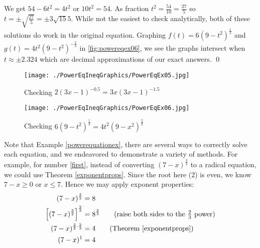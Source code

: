 \begin{ex}
\begin{enumerate}
We get $54 - 6t^2 = 4t^2$ or $10t^2 = 54$.  As fraction $t^2 = \frac{54}{10} = \frac{27}{5}$ so $t = \pm \sqrt{\frac{27}{5}} = \pm 3 \sqrt{15}{5}$.  While not the easiest to check analytically, both of these solutions do work in the original equation.  Graphing $f(t) = 6(9-t^2)^{\frac{1}{3}} $ and $g(t) =  4t^2 (9-t^2)^{-\frac{2}{3}}$ in \autoref{fig:powereqex06}, we see the graphs intersect when $t \approx \pm 2.324$ which are decimal approximations of our exact answers.
\qed

\begin{figure}
\begin{center}

\texttt{[image: ./PowerEqIneqGraphics/PowerEqEx05.jpg]} 

\caption{Checking $2(3x-1)^{-0.5}  = 3x (3x-1)^{-1.5}$}
\label{fig:powereqex05}
\end{center}
\end{figure}

\begin{figure}
\begin{center}
      
\texttt{[image: ./PowerEqIneqGraphics/PowerEqEx06.jpg]}

\caption{Checking  $6(9-t^2)^{\frac{1}{3}} = 4t^2 (9-x^2)^{\frac{2}{3}}$}
\label{fig:powereqex06}

\end{center} 
\end{figure}

\end{enumerate}

\end{ex}

Note that Example \ref{powerequationex}, there are several ways to correctly solve each equation, and we endeavored to demonstrate a variety of methods.  For example, for number \ref{first}, instead of converting $(7-x)^{\frac{3}{2}}$ to a radical equation, we could use Theorem \ref{exponentprops}.  Since the root here ($2$) is even, we know $7-x \geq 0$ or $x \leq 7$.  Hence we may apply exponent properties: 
\begin{align*}
(7-x)^{\frac{3}{2}} & = 8 \\
 \left[(7-x)^{\frac{3}{2}}\right]^{\frac{2}{3}} & = 8^{\frac{2}{3}} \tag{raise both sides to the $\frac{2}{3}$ power} \\
 (7-x)^{\frac{3}{2} \cdot \frac{2}{3}} & = 4 \tag{Theorem \ref{exponentprops}} \\
(7-x)^{1} & = 4 \\
\end{align*}

